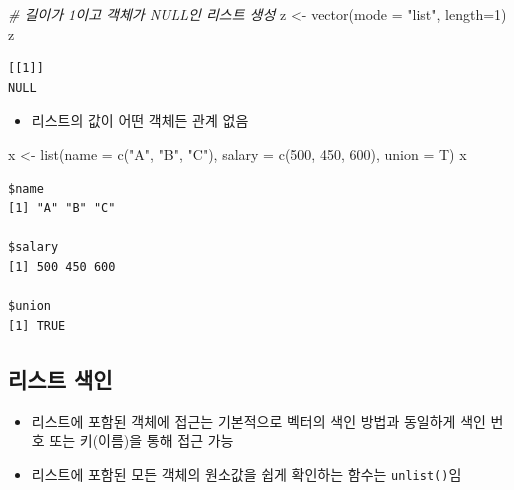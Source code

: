 \documentclass[
  11pt,
]{krantz}
\newenvironment{Shaded}{\begin{snugshade}}{\end{snugshade}}
\newcommand{\AttributeTok}[1]{\textcolor[rgb]{0.61,0.61,0.61}{#1}}
\newcommand{\CommentTok}[1]{\textcolor[rgb]{0.37,0.37,0.37}{\textit{#1}}}
\newcommand{\DecValTok}[1]{\textcolor[rgb]{0.06,0.06,0.06}{#1}}
\newcommand{\FunctionTok}[1]{\textcolor[rgb]{0,0,0}{#1}}
\newcommand{\NormalTok}[1]{#1}
\newcommand{\OtherTok}[1]{\textcolor[rgb]{0.37,0.37,0.37}{#1}}
\newcommand{\StringTok}[1]{\textcolor[rgb]{0.5,0.5,0.5}{#1}}
\providecommand{\tightlist}{%
  \setlength{\itemsep}{0pt}\setlength{\parskip}{0pt}}
\begin{document}
\footnotesize

\begin{Shaded}
\begin{Highlighting}[]
\CommentTok{\# 길이가 1이고 객체가 NULL인 리스트 생성}
\NormalTok{z }\OtherTok{\textless{}{-}} \FunctionTok{vector}\NormalTok{(}\AttributeTok{mode =} \StringTok{"list"}\NormalTok{, }\AttributeTok{length=}\DecValTok{1}\NormalTok{)}
\NormalTok{z}
\end{Highlighting}
\end{Shaded}

\begin{verbatim}
[[1]]
NULL
\end{verbatim}

\normalsize

\begin{itemize}
\tightlist
\item
  리스트의 값이 어떤 객체든 관계 없음
\end{itemize}

\footnotesize

\begin{Shaded}
\begin{Highlighting}[]
\NormalTok{x }\OtherTok{\textless{}{-}} \FunctionTok{list}\NormalTok{(}\AttributeTok{name =} \FunctionTok{c}\NormalTok{(}\StringTok{"A"}\NormalTok{, }\StringTok{"B"}\NormalTok{, }\StringTok{"C"}\NormalTok{), }
          \AttributeTok{salary =} \FunctionTok{c}\NormalTok{(}\DecValTok{500}\NormalTok{, }\DecValTok{450}\NormalTok{, }\DecValTok{600}\NormalTok{), }\AttributeTok{union =}\NormalTok{ T)}
\NormalTok{x}
\end{Highlighting}
\end{Shaded}

\begin{verbatim}
$name
[1] "A" "B" "C"

$salary
[1] 500 450 600

$union
[1] TRUE
\end{verbatim}

\normalsize

\hypertarget{list-index}{%
\subsection{리스트 색인}\label{list-index}}

\begin{itemize}
\tightlist
\item
  리스트에 포함된 객체에 접근는 기본적으로 벡터의 색인 방법과 동일하게 색인 번호 또는 키(이름)을 통해 접근 가능
\item
  리스트에 포함된 모든 객체의 원소값을 쉽게 확인하는 함수는 \texttt{unlist()}임
\end{itemize}
\end{document}
